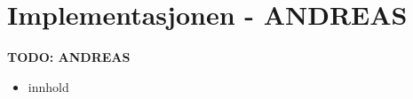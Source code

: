 \section{Implementasjonen - {ANDREAS}}
\label{sect:disc:contextSens}
\textbf{\LARGE TODO: {ANDREAS}}
\begin{itemize}
  \item innhold
  
\end{itemize}